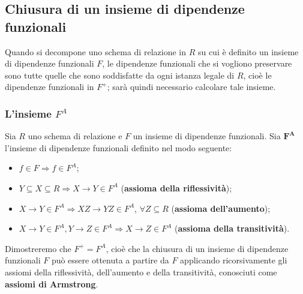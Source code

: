 \subsection{Chiusura di un insieme di dipendenze funzionali}
Quando si decompone uno schema di relazione in $R$ su cui è definito un insieme di 
dipendenze funzionali $F$, le dipendenze funzionali che si vogliono preservare sono
tutte quelle che sono soddisfatte da ogni istanza legale di $R$, cioè le dipendenze
funzionali in $F^+$; sarà quindi necessario calcolare tale insieme.

\subsubsection{L'insieme $F^A$}
\begin{defn}
Sia $R$ uno schema di relazione e $F$ un insieme di dipendenze funzionali. Sia $\mathbf{F^A}$ l'insieme
di dipendenze funzionali definito nel modo seguente:
\begin{itemize}
 \item $f \in F \Rightarrow f \in F^A$;
 \item $Y \subseteq X \subseteq R \Rightarrow X\rightarrow Y \in F^A$ (\textbf{assioma della riflessività});
 \item $X \rightarrow Y \in F^A \Rightarrow XZ\rightarrow YZ \in F^A$, $\forall Z\subseteq R$ 
 (\textbf{assioma dell'aumento});
 \item $X \rightarrow Y \in F^A, Y \rightarrow Z \in F^A \Rightarrow X \rightarrow Z \in F^A$ 
 (\textbf{assioma della transitività}).
\end{itemize}
\end{defn}
Dimostreremo che $F^+=F^A$, cioè che la chiusura di un insieme di dipendenze funzionali $F$ può essere
ottenuta a partire da $F$ applicando ricorsivamente gli assiomi della riflessività, dell'aumento e della
transitività, conosciuti come \textbf{assiomi di Armstrong}.

